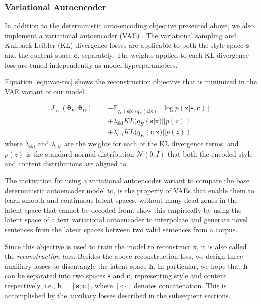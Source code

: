 \documentclass[letterpaper]{article} %
\newcommand{\rmx}{\mathrm x}
\newcommand{\loss}[1]{J_\text{#1}}
\newcommand{\citeay}[1]{\citeauthor{#1} \shortcite{#1}}
\begin{document}
\subsubsection{Variational Autoencoder}

In addition to the deterministic auto-encoding objective presented above, we also implement a variational autoencoder (VAE) \cite{kingma2013auto}. The variational sampling and Kullback-Leibler (KL) divergence \cite{kullback1951information} losses are applicable to both the style space $\bm s$ and the content space $\bm c$, separately. The weights applied to each KL divergence loss are tuned independently as model hyperparameters.

Equation \ref{eqn:vae-rec} shows the reconstruction objective that is minimized in the VAE variant of our model.

\begin{align} \label{eqn:vae-rec}
	\loss{rec}(\bm\theta_E, \bm\theta_D) = \nonumber
	 & - \mathbb{E}_{q_{E}(\bm s|\rmx) q_{E}(\bm c|\rmx)} [\log p(\rmx|\bm s, \bm c)] \nonumber \\
	 & + \lambda_{\text{skl}} KL(q_{E}(\bm s|\rmx)||p(z)) \nonumber                             \\
	 & + \lambda_{\text{ckl}} KL(q_{E}(\bm c|\rmx)||p(z))
\end{align}
where $\lambda_{\text{skl}}$ and $\lambda_{\text{ckl}}$ are the weights for each of the KL divergence terms, and $p(z)$ is the standard normal distribution $\mathcal{N}(0,I)$ that both the encoded style and content distributions are aligned to.

The motivation for using a variational autoencoder variant to compare the base deterministic autoencoder model to, is the property of VAEs that enable them to learn smooth and continuous latent spaces, without many dead zones in the latent space that cannot be decoded from. \citeay{bowman2016generating} show this empirically by using the latent space of a text variational autoencoder to interpolate and generate novel sentences from the latent spaces between two valid sentences from a corpus.

Since this objective is used to train the model to reconstruct $\rmx$, it is also called the \textit{reconstruction loss}. Besides the above reconstruction loss, we design three auxiliary losses to disentangle the latent space $\bm h$. In particular, we hope that $\bm h$ can be separated into two spaces $\bm s$ and $\bm c$, representing style and content respectively, i.e., $\bm h = [\bm s ; \bm c]$, where $[\cdot;\cdot]$ denotes concatenation. This is accomplished by the auxiliary losses described in the subsequent sections.
\end{document}
